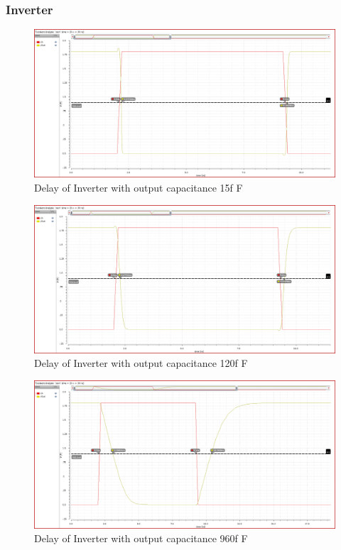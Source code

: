 \documentclass[conference]{IEEEtran}
\begin{document}
\subsubsection{Inverter}
\begin{figure}[h!]
    \centering
    \includegraphics[width=0.9\linewidth]{inv_C1.png}
    \caption{Delay of Inverter with output capacitance 15f F}
\end{figure}

\begin{figure}[h!]
    \centering
    \includegraphics[width=0.9\linewidth]{inv_C2.png}
    \caption{Delay of Inverter with output capacitance 120f F}
\end{figure}

\begin{figure}[h!]
    \centering
    \includegraphics[width=0.9\linewidth]{inv_C3.png}
    \caption{Delay of Inverter with output capacitance 960f F}
\end{figure}
\end{document}
